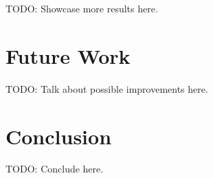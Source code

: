 \documentclass{article}
\begin{document}
TODO: Showcase more results here.

\section{Future Work}

TODO: Talk about possible improvements here.

\section{Conclusion}

TODO: Conclude here.

\newpage
\appendix




\end{document}
